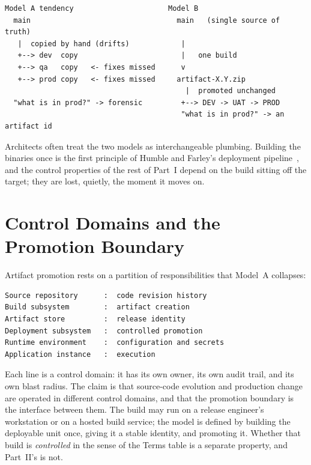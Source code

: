 \documentclass[11pt]{article}
\begin{document}
\begin{lstlisting}
Model A tendency                      Model B
  main                                  main   (single source of truth)
   |  copied by hand (drifts)            |
   +--> dev  copy                        |   one build
   +--> qa   copy   <- fixes missed      v
   +--> prod copy   <- fixes missed     artifact-X.Y.zip
                                          |  promoted unchanged
  "what is in prod?" -> forensic         +--> DEV -> UAT -> PROD
                                         "what is in prod?" -> an artifact id
\end{lstlisting}

Architects often treat the two models as interchangeable plumbing. Building the binaries once is the first principle of Humble and Farley's deployment pipeline~\cite{ContinuousDelivery}, and the control properties of the rest of Part~I depend on the build sitting off the target; they are lost, quietly, the moment it moves on.

\section{Control Domains and the Promotion Boundary}

Artifact promotion rests on a partition of responsibilities that Model~A collapses:

\begin{lstlisting}
Source repository      :  code revision history
Build subsystem        :  artifact creation
Artifact store         :  release identity
Deployment subsystem   :  controlled promotion
Runtime environment    :  configuration and secrets
Application instance   :  execution
\end{lstlisting}

Each line is a control domain: it has its own owner, its own audit trail, and its own blast radius. The claim is that source-code evolution and production change are operated in different control domains, and that the promotion boundary is the interface between them. The build may run on a release engineer's workstation or on a hosted build service; the model is defined by building the deployable unit once, giving it a stable identity, and promoting it. Whether that build is \emph{controlled} in the sense of the Terms table is a separate property, and Part~II's is not.
\end{document}
